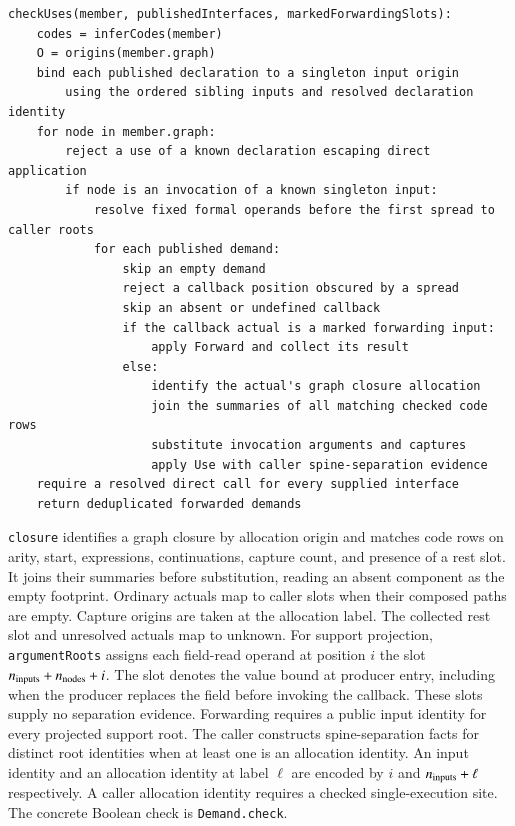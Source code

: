 \documentclass[10pt,a4paper]{article}
\theoremstyle{definition}
\newcommand{\lean}[1]{\textcolor{leanc}{\texttt{\small #1}}}
\begin{document}
\begin{lstlisting}[language=Pseudocode]
checkUses(member, publishedInterfaces, markedForwardingSlots):
    codes = inferCodes(member)
    O = origins(member.graph)
    bind each published declaration to a singleton input origin
        using the ordered sibling inputs and resolved declaration identity
    for node in member.graph:
        reject a use of a known declaration escaping direct application
        if node is an invocation of a known singleton input:
            resolve fixed formal operands before the first spread to caller roots
            for each published demand:
                skip an empty demand
                reject a callback position obscured by a spread
                skip an absent or undefined callback
                if the callback actual is a marked forwarding input:
                    apply Forward and collect its result
                else:
                    identify the actual's graph closure allocation
                    join the summaries of all matching checked code rows
                    substitute invocation arguments and captures
                    apply Use with caller spine-separation evidence
    require a resolved direct call for every supplied interface
    return deduplicated forwarded demands
\end{lstlisting}

\lean{closure} identifies a graph closure by allocation origin
and matches code rows on arity, start, expressions, continuations,
capture count, and presence of a rest slot. It joins their summaries before substitution,
reading an absent component as the empty footprint. Ordinary
actuals map to caller slots when their composed paths are empty.
Capture origins are taken at the allocation label. The collected
rest slot and unresolved actuals map to unknown. For support
projection, \lean{argumentRoots} assigns each field-read operand at
position $i$ the slot $n_{\rm inputs}+n_{\rm nodes}+i$. The slot
denotes the value bound at producer entry, including when the
producer replaces the field before invoking the callback. These
slots supply no separation evidence. Forwarding requires a public
input identity for every projected support root. The caller constructs spine-separation
facts for distinct root identities when at least one is an
allocation identity. An input identity and an allocation identity
at label $\ell$ are encoded by $i$ and $n_{\rm inputs}+\ell$
respectively. A caller allocation identity requires a checked
single-execution site. The concrete Boolean check is \lean{Demand.check}.
\end{document}
